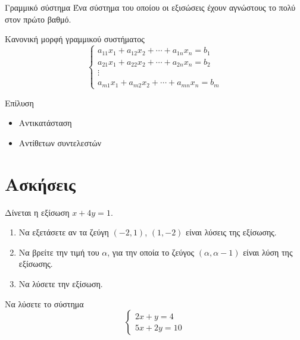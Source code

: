 \documentclass{../presentation}
\begin{document}
\begin{frame}
  \begin{block}{Γραμμικό σύστημα}
    Ένα σύστημα του οποίου οι εξισώσεις έχουν αγνώστους το πολύ στον πρώτο βαθμό.
  \end{block}
  \begin{block}{Κανονική μορφή γραμμικού συστήματος}
    $$
      \begin{cases}
        a_{11}x_1+a_{12}x_2+\cdots+a_{1n}x_n=b_1 \\
        a_{21}x_1+a_{22}x_2+\cdots+a_{2n}x_n=b_2 \\
        \vdots                                   \\
        a_{m1}x_1+a_{m2}x_2+\cdots+a_{mn}x_n=b_m
      \end{cases}
    $$
  \end{block}

\end{frame}

\begin{frame}{Επίλυση}
  \begin{itemize}[<+- | alert@+>]
    \item Αντικατάσταση
    \item Αντίθετων συντελεστών
  \end{itemize}
\end{frame}

\section{Ασκήσεις}
\exercises

\begin{askisi}
  Δίνεται η εξίσωση $x+4y=1$.
  \begin{enumerate}
    \item Να εξετάσετε αν τα ζεύγη $(-2,1)$, $(1,-2)$ είναι λύσεις της εξίσωσης.
    \item Να βρείτε την τιμή του $α$, για την οποία το ζεύγος $(α,α-1)$ είναι λύση της εξίσωσης.
    \item Να λύσετε την εξίσωση.
  \end{enumerate}
\end{askisi}

\begin{askisi}
  Να λύσετε το σύστημα
  $$\begin{cases}
      2x+y=4 \\
      5x+2y=10
    \end{cases}$$
\end{askisi}
\end{document}

